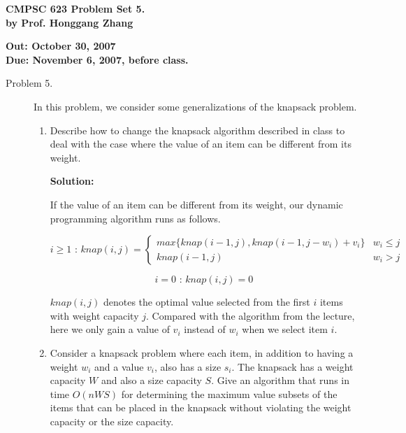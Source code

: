 \documentclass[11pt]{article}
\begin{document}

\begin{center}
{\bf CMPSC 623 Problem Set 5. } \\
{\bf by Prof. Honggang Zhang} \\
\end{center}
\begin{center}
{\bf Out: October 30, 2007} \\
{\bf Due: November 6, 2007, before class.} \\

\end{center}


\begin{description}


\item[Problem 5.]

In this problem, we consider some generalizations of the knapsack problem.

\begin{enumerate}
\item Describe how to change the knapsack algorithm described in class to deal with the case where
the value of an item can be different from its weight.


\noindent \textbf{Solution:}

If the value of an item can be different from its weight, our dynamic programming algorithm runs as
follows.

\[i\geq1 \textrm{  :  } knap(i,j)=\left\{\begin{array}{ll} max\{knap(i-1,j),knap(i-1,j-w_i)+v_i\} & w_i\leq j\\ knap(i-1,j) & w_i>j

\end{array}\right.\]

\[i=0 \textrm{  :  } knap(i,j)=0\]

$knap(i,j)$ denotes the optimal value selected from the first $i$ items with weight capacity $j$.
Compared with the algorithm from the lecture, here we only gain a value of $v_i$ instead of $w_i$
when we select item $i$.



\item Consider a knapsack problem where each item, in addition to having a weight $w_i$ and a
value $v_i$, also has a size $s_i$. The knapsack has a weight capacity $W$ and also a size capacity
$S$. Give an algorithm that runs in time $O(nWS)$ for determining the maximum value subsets of the
items that can be placed in the knapsack without violating the weight capacity or the size
capacity.


\end{enumerate}
\end{description}
\end{document}
